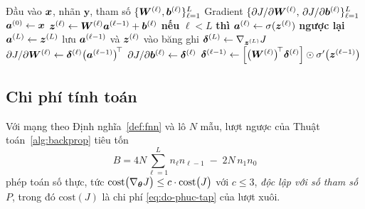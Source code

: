 \begin{algorithm}[htbp]
\caption{Lan truyền ngược cho mạng truyền thẳng $L$ lớp}
\label{alg:backprop}
\begin{algorithmic}[1]
\Require Đầu vào $\bm{x}$, nhãn $\bm{y}$, tham số
  $\{\bm{W}^{(\ell)},\bm{b}^{(\ell)}\}_{\ell=1}^{L}$
\Ensure Gradient $\{\partial J/\partial \bm{W}^{(\ell)},\,
  \partial J/\partial \bm{b}^{(\ell)}\}_{\ell=1}^{L}$
\State $\bm{a}^{(0)} \gets \bm{x}$
 
  \State $\bm{z}^{(\ell)} \gets \bm{W}^{(\ell)}\bm{a}^{(\ell-1)} + \bm{b}^{(\ell)}$
  \State \textbf{nếu} $\ell < L$ \textbf{thì} $\bm{a}^{(\ell)} \gets
    \sigma(\bm{z}^{(\ell)})$ \textbf{ngược lại} $\bm{a}^{(L)} \gets \bm{z}^{(L)}$
  \State lưu $\bm{a}^{(\ell-1)}$ và $\bm{z}^{(\ell)}$ vào băng ghi
\EndFor
\State $\bm{\delta}^{(L)} \gets \nabla_{\bm{z}^{(L)}} J$
  \Comment{\eqref{eq:bp1}}
 
  \State $\partial J/\partial \bm{W}^{(\ell)} \gets
    \bm{\delta}^{(\ell)}\big(\bm{a}^{(\ell-1)}\big)^{\!\top}$
    \Comment{\eqref{eq:bp3}}
  \State $\partial J/\partial \bm{b}^{(\ell)} \gets \bm{\delta}^{(\ell)}$
    \Comment{\eqref{eq:bp4}}
    \State $\bm{\delta}^{(\ell-1)} \gets
      \left[\big(\bm{W}^{(\ell)}\big)^{\!\top}\bm{\delta}^{(\ell)}\right]
      \odot \sigma'\!\left(\bm{z}^{(\ell-1)}\right)$
      \Comment{\eqref{eq:bp2}}
  \EndIf
\EndFor
\end{algorithmic}
\end{algorithm}
 
\subsection{Chi phí tính toán}
\label{subsec:chi-phi-bp}
 
\begin{menhde}
\label{md:chi-phi-bp}
Với mạng theo Định nghĩa~\ref{def:fnn} và lô $N$ mẫu, lượt ngược của
Thuật toán~\ref{alg:backprop} tiêu tốn
\begin{equation}
B = 4N\sum_{\ell=1}^{L} n_\ell n_{\ell-1}
  \;-\; 2N\, n_1 n_0
\label{eq:bp-cost-exact}
\end{equation}
phép toán số thực, tức
$\mathrm{cost}\big(\nabla_{\bm{\theta}} J\big) \le c\cdot
\mathrm{cost}\big(J\big)$ với $c \le 3$, \emph{độc lập với số tham số $P$}, trong
đó $\mathrm{cost}(J)$ là chi phí \eqref{eq:do-phuc-tap} của lượt xuôi.
\end{menhde}
 
